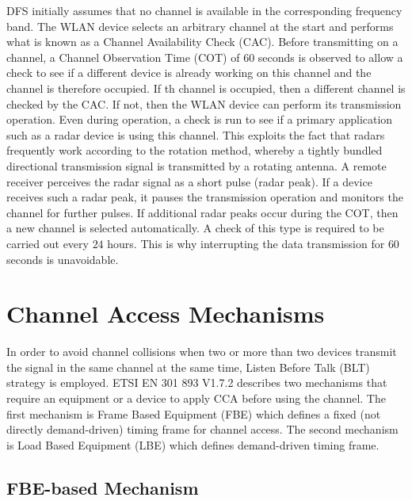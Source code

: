 DFS initially assumes that no channel is available in the corresponding frequency band. The WLAN device selects an arbitrary channel at the start and performs what is known as a Channel Availability Check (CAC). Before transmitting on a channel, a Channel Observation Time (COT) of $60$ seconds is observed to allow a check to see if a different device is already working on this channel and the channel is therefore occupied. If th channel is occupied, then a different channel is checked by the CAC. If not, then the WLAN device can perform its transmission operation. Even during operation, a check is run to see if a primary application such as a radar device is using this channel. This exploits the fact that radars frequently work according to the rotation method, whereby a tightly bundled directional transmission signal is transmitted by a rotating antenna. A remote receiver perceives the radar signal as a short pulse (radar peak). If a device receives such a radar peak, it pauses the transmission operation and monitors the channel for further pulses. If additional radar peaks occur during the COT, then a new channel is selected automatically. A check of this type is required to be carried out every $24$ hours. This is why interrupting the data transmission for $60$ seconds is unavoidable. 


\section{Channel Access Mechanisms}
\label{subsec:ETSI-overview}

In order to avoid channel collisions when two or more than two devices transmit the signal in the same channel at the same time, Listen Before Talk (BLT) strategy is employed. ETSI EN 301 893 V1.7.2 \cite{LBT-ETSI-2014} describes two mechanisms that require an equipment or a device to apply CCA before using the channel. The first mechanism is Frame Based Equipment (FBE) which defines a fixed (not directly demand-driven) timing frame for channel access. The second mechanism is Load Based Equipment (LBE) which defines demand-driven timing frame.

\subsection{FBE-based Mechanism}
\label{etsi-lbt:fbe}

